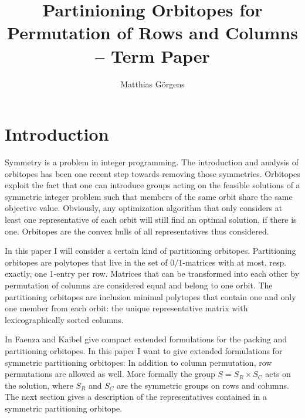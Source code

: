 \documentclass{amsart}
\author{Matthias Görgens}
\theoremstyle{definition}
\begin{document}
\title{Partinioning Orbitopes for Permutation of Rows and Columns -- Term Paper}
\maketitle


\section{Introduction}
Symmetry is a problem in integer programming.  The introduction and
analysis of orbitopes has been one recent step towards removing those
symmetries.  Orbitopes exploit the fact that one can introduce groups
acting on the feasible solutions of a symmetric integer problem such
that members of the same orbit share the same objective value.
Obviously, any optimization algorithm that only considers at least one
representative of each orbit will still find an optimal solution, if
there is one.  Orbitopes are the convex hulls of all representatives
thus considered.

In this paper I will consider a certain kind of partitioning
orbitopes.  Partitioning orbitopes are polytopes that live in the
set of $0/1$-matrices with at most, resp. exactly, one 1-entry per
row.  Matrices that can be transformed into each other by permutation
of columns are considered equal and belong to one orbit.  The
partitioning orbitopes are inclusion minimal polytopes that contain
one and only one member from each orbit: the unique representative
matrix with lexicographically sorted columns.

In \cite{faenza-2008} Faenza and Kaibel give compact extended
formulations for the packing and partitioning orbitopes.  In this
paper I want to give extended formulations for symmetric partitioning
orbitopes: In addition to column permutation, row permutations are
allowed as well.  More formally the group \(S = S_R \times S_C\) acts
on the solution, where \(S_R\) and \(S_C\) are the symmetric groups on
rows and columns.  The next section gives a description of the
representatives contained in a symmetric partitioning orbitope.

\end{document}
